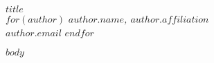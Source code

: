 \documentclass[12pt,a4paper]{article}
\newcommand\email[1]{{\tt\href{mailto:#1}{#1}}} %
\begin{document}
\raggedbottom
\begin{center}
\textbf{$title$}\\
\vspace{0.5em}
$for(author)$
\textit{$author.name$, $author.affiliation$}\\
\vspace{0.25em}
\email{$author.email$}
$endfor$
\end{center}

$body$

\renewcommand\bibname{References} %
\end{document}
